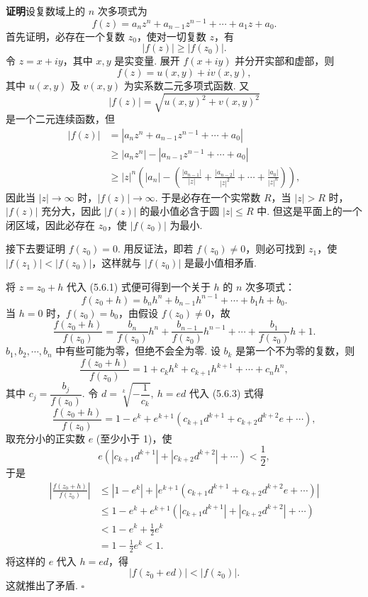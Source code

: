 \documentclass[UTF8,12pt,a4paper,fontset=fandol]{ctexart}
\begin{document}
\noindent\textbf{证明}\quad 设复数域上的 $n$ 次多项式为
\begin{equation}
f(z)=a_nz^n+a_{n-1}z^{n-1}+\cdots+a_1z+a_0.
\tag{5.6.1}
\end{equation}
首先证明，必存在一个复数 $z_0$，使对一切复数 $z$，有
\[
|f(z)|\geq |f(z_0)|.
\]
令 $z=x+iy$，其中 $x,y$ 是实变量. 展开 $f(x+iy)$ 并分开实部和虚部，则
\[
f(z)=u(x,y)+iv(x,y),
\]
其中 $u(x,y)$ 及 $v(x,y)$ 为实系数二元多项式函数. 又
\[
|f(z)|=\sqrt{u(x,y)^2+v(x,y)^2}
\]
是一个二元连续函数，但
\[
\begin{aligned}
|f(z)|&=|a_nz^n+a_{n-1}z^{n-1}+\cdots+a_0|\\
&\geq |a_nz^n|-|a_{n-1}z^{n-1}+\cdots+a_0|\\
&\geq |z|^n\left(|a_n|-\left(\frac{|a_{n-1}|}{|z|}+\frac{|a_{n-2}|}{|z|^2}+\cdots+\frac{|a_0|}{|z|^n}\right)\right),
\end{aligned}
\]
因此当 $|z|\to\infty$ 时，$|f(z)|\to\infty$. 于是必存在一个实常数 $R$，当 $|z|>R$ 时，$|f(z)|$ 充分大，因此 $|f(z)|$ 的最小值必含于圆 $|z|\leq R$ 中. 但这是平面上的一个闭区域，因此必存在 $z_0$，使 $|f(z_0)|$ 为最小.

接下去要证明 $f(z_0)=0$. 用反证法，即若 $f(z_0)\neq 0$，则必可找到 $z_1$，使 $|f(z_1)|<|f(z_0)|$，这样就与 $|f(z_0)|$ 是最小值相矛盾.

将 $z=z_0+h$ 代入 (5.6.1) 式便可得到一个关于 $h$ 的 $n$ 次多项式：
\begin{equation}
f(z_0+h)=b_nh^n+b_{n-1}h^{n-1}+\cdots+b_1h+b_0.
\tag{5.6.2}
\end{equation}
当 $h=0$ 时，$f(z_0)=b_0$，由假设 $f(z_0)\neq 0$，故
\[
\frac{f(z_0+h)}{f(z_0)}=\frac{b_n}{f(z_0)}h^n+\frac{b_{n-1}}{f(z_0)}h^{n-1}+\cdots+\frac{b_1}{f(z_0)}h+1.
\]
$b_1,b_2,\cdots,b_n$ 中有些可能为零，但绝不会全为零. 设 $b_k$ 是第一个不为零的复数，则
\begin{equation}
\frac{f(z_0+h)}{f(z_0)}=1+c_kh^k+c_{k+1}h^{k+1}+\cdots+c_nh^n,
\tag{5.6.3}
\end{equation}
其中 $c_j=\dfrac{b_j}{f(z_0)}$. 令 $d=\sqrt[k]{-\dfrac{1}{c_k}},\ h=ed$ 代入 (5.6.3) 式得
\[
\frac{f(z_0+h)}{f(z_0)}=1-e^k+e^{k+1}(c_{k+1}d^{k+1}+c_{k+2}d^{k+2}e+\cdots),
\]
取充分小的正实数 $e$ (至少小于 1)，使
\[
e(|c_{k+1}d^{k+1}|+|c_{k+2}d^{k+2}|+\cdots)<\frac12,
\]
于是
\[
\begin{aligned}
\left|\frac{f(z_0+h)}{f(z_0)}\right|
&\leq |1-e^k|+|e^{k+1}(c_{k+1}d^{k+1}+c_{k+2}d^{k+2}e+\cdots)|\\
&\leq 1-e^k+e^{k+1}(|c_{k+1}d^{k+1}|+|c_{k+2}d^{k+2}|+\cdots)\\
&<1-e^k+\frac12e^k\\
&=1-\frac12e^k<1.
\end{aligned}
\]
将这样的 $e$ 代入 $h=ed$，得
\[
|f(z_0+ed)|<|f(z_0)|.
\]
这就推出了矛盾. $\square$
\end{document}

